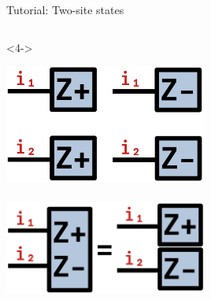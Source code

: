 \begin{frame}[fragile]{Tutorial: Two-site states}
\begin{columns}
\begin{column}{5cm}
\begin{onlyenv}<4->
\vspace*{0.0cm}
~\\
\begin{center}
\includegraphics[width=0.5\textwidth]{
  slides/assets/Zp1Zm1Zp2Zm2.png
} \\
~\\
\includegraphics[width=0.5\textwidth]{
  slides/assets/ZpZm12_eq_Zp1Zm2.png
}
\end{center}
\vspace*{0.0cm}
\end{onlyenv}

\end{column}

\end{columns}

\end{frame}
